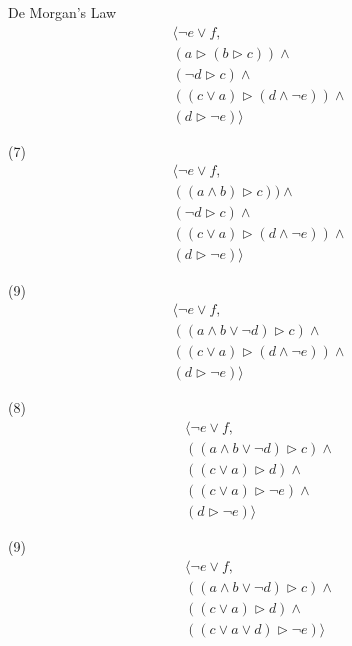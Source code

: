 \documentclass[12pt,a4paper]{article}
\begin{document}
\hfill\break
\setlength{\columnsep}{50pt}
\begin{multicols}{2}
	De Morgan's Law
	\begin{align*} 
		\langle\neg e \lor f, 
		\\ (a \triangleright (b \triangleright c))  \land 
		\\ (\neg d \triangleright c) \land 
		\\ ((c \lor a) \triangleright (d \land \neg e)) \land 
		\\ (d \triangleright \neg e) \rangle
	\end{align*} 

	(7)
	\begin{align*} 
		\langle\neg e \lor f, 
		\\ ((a \land b) \triangleright c))  \land 
		\\ (\neg d \triangleright c) \land 
		\\ ((c \lor a) \triangleright (d \land \neg e)) \land 
		\\ (d \triangleright \neg e) \rangle
	\end{align*} 
	
	(9)
	\begin{align*} 
		\langle\neg e \lor f, 
		\\ ((a \land b \lor \neg d) \triangleright c) \land 
		\\ ((c \lor a) \triangleright (d \land \neg e)) \land 
		\\ (d \triangleright \neg e) \rangle
	\end{align*} 
	
	(8)
	\begin{align*} 
		\langle\neg e \lor f,
		\\ ((a \land b \lor \neg d) \triangleright c) \land 
		\\ ((c \lor a) \triangleright d) \land 
		\\((c \lor a) \triangleright \neg e) \land 
		\\(d \triangleright \neg e) \rangle
	\end{align*} 

	(9)
	\begin{align*} 
		\langle\neg e \lor f, 
		\\ ((a \land b \lor \neg d) \triangleright c) \land 
		\\ ((c \lor a) \triangleright d) \land 
		\\ ((c \lor a \lor d) \triangleright \neg e) \rangle
	\end{align*}
\end{multicols}
\end{document}
